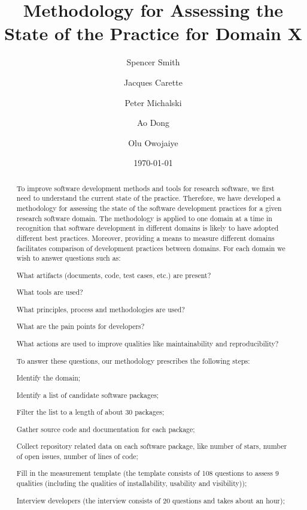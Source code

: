 \documentclass[letterpaper,cleveref]{lipics-v2019}
\title{Methodology for Assessing the State of the Practice for Domain X}
\author{Spencer Smith}{McMaster University, Canada}{smiths@mcmaster.ca}{}{}
\author{Jacques Carette}{McMaster University, Canada}{carette@mcmaster.ca}{}{}
\author{Peter Michalski}{McMaster University, Canada}{michap@mcmaster.ca}{}{}
\author{Ao Dong}{McMaster University, Canada}{donga9@mcmaster.ca}{}{}
\author{Olu Owojaiye}{McMaster University, Canada}{owojaiyo@mcmaster.ca}{}{}
\date{\today}
\begin{document}
\maketitle

\begin{abstract}
	To improve software development methods and tools for research software, we
	first need to understand the current state of the practice.  Therefore, we
	have developed a methodology for assessing the state of the software
	development practices for a given research software domain.  The methodology
	is applied to one domain at a time in recognition that software development in
	different domains is likely to have adopted different best practices.
	Moreover, providing a means to measure different domains facilitates
	comparison of development practices between domains.  For each domain we wish
	to answer questions such as: 
  \begin{inparaenum}[i)]
    \item What artifacts (documents, code, test cases, etc.) are present?
    \item What tools are used?
    \item What principles, process and methodologies are used?
    \item What are the pain points for developers?
    \item What actions are used to improve qualities like maintainability and
    reproducibility?
  \end{inparaenum} 
  To answer these questions, our methodology prescribes the following steps: 
  \begin{inparaenum}[i)] 
    \item Identify the domain;
    \item Identify a list of candidate software packages;
    \item Filter the list to a length of about 30 packages;
    \item Gather source code and documentation for each package;
    \item Collect repository related data on each software package, like number
    of stars, number of open issues, number of lines of code;
    \item Fill in the measurement template (the template consists of 108
    questions to assess 9 qualities (including the qualities of installability,
    usability and visibility));
    \item Interview developers (the interview consists of 20 questions and takes
    about an hour);

\end{inparaenum}
\end{abstract}
\end{document}
